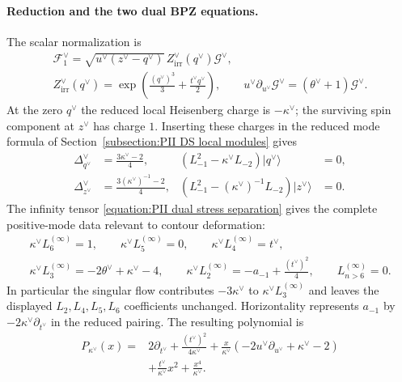 \documentclass[a4paper,11pt]{article}
\newcommand{\cF}{\mathcal{F}}
\numberwithin{equation}{section}
\begin{document}
\paragraph*{Reduction and the two dual BPZ equations.}
The scalar normalization is
\begin{equation}
	\begin{gathered}
		\cF_{1}^{\vee}
		=\sqrt{u^{\vee}(z^{\vee}-q^{\vee})}\,
		Z_{\mathrm{irr}}^{\vee}(q^{\vee})\mathcal{G}^{\vee},\\
		Z_{\mathrm{irr}}^{\vee}(q^{\vee})
		=\exp\left(\frac{(q^{\vee})^{3}}{3}
		+\frac{t^{\vee}q^{\vee}}{2}\right),\qquad
		u^{\vee}\partial_{u^{\vee}}\mathcal{G}^{\vee}
		=(\theta^{\vee}+1)\mathcal{G}^{\vee}.
	\end{gathered}
\end{equation}
At the zero $q^{\vee}$ the reduced local Heisenberg charge is
$-\kappa^{\vee}$; the surviving spin component at $z^{\vee}$ has
charge $1$.  Inserting these charges in the reduced mode formula
of Section~\ref{subsection:PII DS local modules} gives
\begin{equation}
	\begin{aligned}
		\Delta_{q^{\vee}}^{\vee}&=\frac{3\kappa^{\vee}-2}{4},&
		(L_{-1}^{2}-\kappa^{\vee}L_{-2})|q^{\vee}\rangle&=0,\\
		\Delta_{z^{\vee}}^{\vee}&=\frac{3(\kappa^{\vee})^{-1}-2}{4},&
		(L_{-1}^{2}-(\kappa^{\vee})^{-1}L_{-2})|z^{\vee}\rangle&=0.
	\end{aligned}
\end{equation}
The infinity tensor \eqref{equation:PII dual stress separation}
gives the complete positive-mode data relevant to contour deformation:
\begin{equation}
	\begin{gathered}
		\kappa^{\vee}L_{6}^{(\infty)}=1,\qquad
		\kappa^{\vee}L_{5}^{(\infty)}=0,\qquad
		\kappa^{\vee}L_{4}^{(\infty)}=t^{\vee},\\
		\kappa^{\vee}L_{3}^{(\infty)}
		=-2\theta^{\vee}+\kappa^{\vee}-4,\qquad
		\kappa^{\vee}L_{2}^{(\infty)}
		=-a_{-1}+\frac{(t^{\vee})^{2}}{4},\qquad
		L_{n>6}^{(\infty)}=0.
	\end{gathered}
\end{equation}
In particular the singular flow contributes $-3\kappa^{\vee}$ to
$\kappa^{\vee}L_{3}^{(\infty)}$ and leaves the displayed
$L_{2},L_{4},L_{5},L_{6}$ coefficients unchanged.  Horizontality
represents $a_{-1}$ by $-2\kappa^{\vee}\partial_{t^{\vee}}$ in the
reduced pairing.  The resulting polynomial is
\begin{equation}
	\begin{aligned}
		P_{\kappa^{\vee}}(x)
		={}&2\partial_{t^{\vee}}+\frac{(t^{\vee})^{2}}{4\kappa^{\vee}}
		+\frac{x}{\kappa^{\vee}}
		(-2u^{\vee}\partial_{u^{\vee}}+\kappa^{\vee}-2)\\
		&+\frac{t^{\vee}}{\kappa^{\vee}}x^{2}
		+\frac{x^{4}}{\kappa^{\vee}}.
	\end{aligned}
\end{equation}
\end{document}
